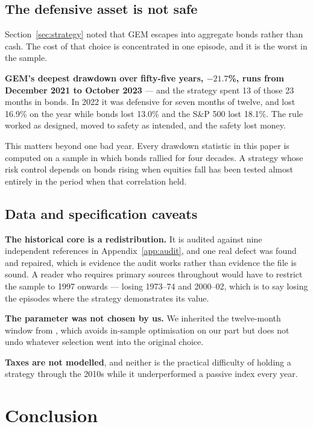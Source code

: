 \documentclass[11pt,a4paper]{article}
\begin{document}
\subsection{The defensive asset is not safe}

Section~\ref{sec:strategy} noted that GEM escapes into aggregate bonds rather
than cash. The cost of that choice is concentrated in one episode, and it is
the worst in the sample.

\textbf{GEM's deepest drawdown over fifty-five years, $-21.7$\%, runs from
December 2021 to October 2023} --- and the strategy spent 13 of those 23 months
in bonds. In 2022 it was defensive for seven months of twelve, and lost 16.9\%
on the year while bonds lost 13.0\% and the S\&P 500 lost 18.1\%. The rule
worked as designed, moved to safety as intended, and the safety lost money.

This matters beyond one bad year. Every drawdown statistic in this paper is
computed on a sample in which bonds rallied for four decades. A strategy whose
risk control depends on bonds rising when equities fall has been tested almost
entirely in the period when that correlation held.

\subsection{Data and specification caveats}

\textbf{The historical core is a redistribution.} It is audited against nine
independent references in Appendix~\ref{app:audit}, and one real defect was
found and repaired, which is evidence the audit works rather than evidence the
file is sound. A reader who requires primary sources throughout would have to
restrict the sample to 1997 onwards --- losing 1973--74 and 2000--02, which is
to say losing the episodes where the strategy demonstrates its value.

\textbf{The parameter was not chosen by us.} We inherited the twelve-month
window from \citet{antonacci2016}, which avoids in-sample optimisation on our
part but does not undo whatever selection went into the original choice.

\textbf{Taxes are not modelled}, and neither is the practical difficulty of
holding a strategy through the 2010s while it underperformed a passive index
every year.

\section{Conclusion}
\label{sec:conclusion}
\end{document}
